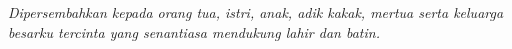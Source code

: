 \thispagestyle{plain}
\clearpage
\null \vfill

\begin{center}
    \begin{minipage}{0.6\textwidth} 
        \centering
        \textit{Dipersembahkan kepada orang tua, istri, anak, adik kakak, mertua serta keluarga besarku tercinta yang senantiasa mendukung lahir dan batin.}
    \end{minipage}
\end{center}

\vfill \clearpage